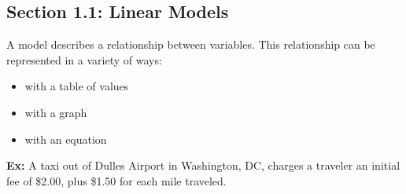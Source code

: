 \documentclass[12pt]{article}
\begin{document}
\vspace{.3in}

\subsection*{Section 1.1: Linear Models}

\noindent A model describes a relationship between variables. This relationship can be represented in a variety of ways:


\begin{itemize}
\item with a table of values\\
\item with a graph\\
\item with an equation\\
\end{itemize}

\vspace{.1in}
\noindent \textbf{Ex:} A taxi out of Dulles Airport in Washington, DC, charges a traveler an initial fee of \$2.00, plus \$1.50 for each mile traveled. 
\end{document}
